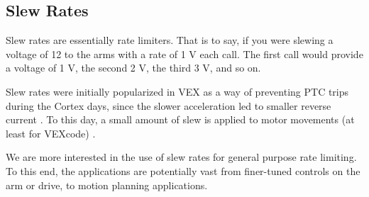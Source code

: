 \subsection{Slew Rates}
Slew rates are essentially rate limiters. That is to say, if you were slewing a voltage of 12 to the arms with a rate of 1 V each call. The first call would provide a voltage of 1 V, the second 2 V, the third 3 V, and so on. 

Slew rates were initially popularized in VEX as a way of preventing PTC trips during the Cortex days, since the slower acceleration led to smaller reverse current \cite{bib:sigbotsslew}. To this day, a small amount of slew is applied to motor movements (at least for VEXcode) \cite{bib:vexinbuiltslew}. 

We are more interested in the use of slew rates for general purpose rate limiting. To this end, the applications are potentially vast from finer-tuned controls on the arm or drive, to motion planning applications.